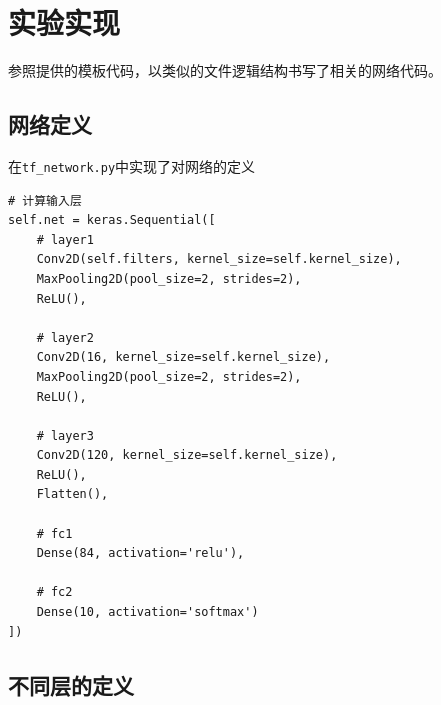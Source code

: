 \documentclass[12pt,a4paper]{article}
\begin{document}
\section{实验实现}

参照提供的模板代码，以类似的文件逻辑结构书写了相关的网络代码。

\subsection{网络定义}

在\texttt{tf\_network.py}中实现了对网络的定义

\begin{lstlisting}
# 计算输入层
self.net = keras.Sequential([
    # layer1
    Conv2D(self.filters, kernel_size=self.kernel_size),
    MaxPooling2D(pool_size=2, strides=2),
    ReLU(),

    # layer2
    Conv2D(16, kernel_size=self.kernel_size),
    MaxPooling2D(pool_size=2, strides=2),
    ReLU(),

    # layer3
    Conv2D(120, kernel_size=self.kernel_size),
    ReLU(),
    Flatten(),

    # fc1
    Dense(84, activation='relu'),

    # fc2
    Dense(10, activation='softmax')
])
\end{lstlisting}

\subsection{不同层的定义}
\end{document}
